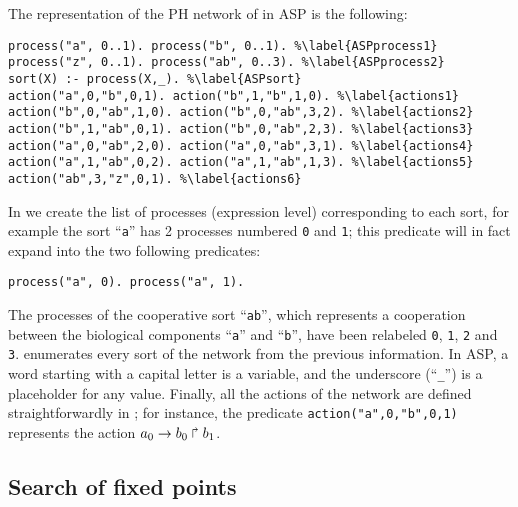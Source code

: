 \begin{example}
\label{ex:asp-ph}
The representation of the PH network of  in ASP is the following:
\begin{lstlisting}
process("a", 0..1). process("b", 0..1). %\label{ASPprocess1}
process("z", 0..1). process("ab", 0..3). %\label{ASPprocess2}
sort(X) :- process(X,_). %\label{ASPsort}
action("a",0,"b",0,1). action("b",1,"b",1,0). %\label{actions1}
action("b",0,"ab",1,0). action("b",0,"ab",3,2). %\label{actions2}
action("b",1,"ab",0,1). action("b",0,"ab",2,3). %\label{actions3}
action("a",0,"ab",2,0). action("a",0,"ab",3,1). %\label{actions4}
action("a",1,"ab",0,2). action("a",1,"ab",1,3). %\label{actions5}
action("ab",3,"z",0,1). %\label{actions6}
\end{lstlisting}
In  we create the list of processes (expression level) corresponding to each sort,
for example the sort ``\texttt{a}'' has 2 processes numbered \texttt{0} and \texttt{1};
this predicate will in fact expand into the two following predicates:
\begin{lstlisting}[numbers=none]
process("a", 0). process("a", 1).
\end{lstlisting}
The processes of the cooperative sort ``\texttt{ab}'',
which represents a cooperation between the biological components ``\texttt{a}'' and ``\texttt{b}'',
have been relabeled \texttt{0}, \texttt{1}, \texttt{2} and \texttt{3}.
 enumerates every sort of the network from the previous information.
In ASP, a word starting with a capital letter is a variable,
and the underscore (``\texttt{\_}'') is a placeholder for any value.
Finally, all the actions of the network are defined straightforwardly in ;
for instance, the predicate \texttt{action("a",0,"b",0,1)} represents the action
$a_0\rightarrow b_0\Rsh b_1$.
\end{example}

\subsection{Search of fixed points}

